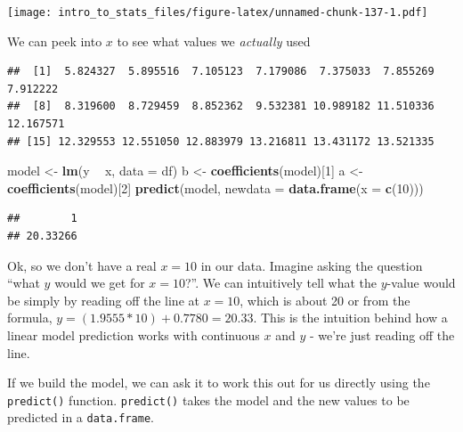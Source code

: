 \documentclass[
]{book}
\newenvironment{Shaded}{\begin{snugshade}}{\end{snugshade}}
\newcommand{\DataTypeTok}[1]{\textcolor[rgb]{0.13,0.29,0.53}{#1}}
\newcommand{\DecValTok}[1]{\textcolor[rgb]{0.00,0.00,0.81}{#1}}
\newcommand{\KeywordTok}[1]{\textcolor[rgb]{0.13,0.29,0.53}{\textbf{#1}}}
\newcommand{\NormalTok}[1]{#1}
\newcommand{\OperatorTok}[1]{\textcolor[rgb]{0.81,0.36,0.00}{\textbf{#1}}}
\newcommand{\StringTok}[1]{\textcolor[rgb]{0.31,0.60,0.02}{#1}}
\begin{document}
\texttt{[image: intro\_to\_stats\_files/figure-latex/unnamed-chunk-137-1.pdf]}

We can peek into \(x\) to see what values we \emph{actually} used

\begin{Shaded}
\end{Shaded}

\begin{verbatim}
##  [1]  5.824327  5.895516  7.105123  7.179086  7.375033  7.855269  7.912222
##  [8]  8.319600  8.729459  8.852362  9.532381 10.989182 11.510336 12.167571
## [15] 12.329553 12.551050 12.883979 13.216811 13.431172 13.521335
\end{verbatim}

\begin{Shaded}
\begin{Highlighting}[]
\NormalTok{model <-}\StringTok{ }\KeywordTok{lm}\NormalTok{(y }\OperatorTok{~}\StringTok{ }\NormalTok{x, }\DataTypeTok{data =}\NormalTok{ df)}
\NormalTok{b <-}\StringTok{ }\KeywordTok{coefficients}\NormalTok{(model)[}\DecValTok{1}\NormalTok{]}
\NormalTok{a <-}\StringTok{ }\KeywordTok{coefficients}\NormalTok{(model)[}\DecValTok{2}\NormalTok{]}
\KeywordTok{predict}\NormalTok{(model, }\DataTypeTok{newdata =} \KeywordTok{data.frame}\NormalTok{(}\DataTypeTok{x =} \KeywordTok{c}\NormalTok{(}\DecValTok{10}\NormalTok{)))}
\end{Highlighting}
\end{Shaded}

\begin{verbatim}
##        1 
## 20.33266
\end{verbatim}

Ok, so we don't have a real \(x = 10\) in our data. Imagine asking the question ``what \(y\) would we get for \(x = 10\)?''. We can intuitively tell what the \(y\)-value would be simply by reading off the line at \(x = 10\), which is about 20 or from the formula, \(y = (1.9555 * 10) + 0.7780 = 20.33\). This is the intuition behind how a linear model prediction works with continuous \(x\) and \(y\) - we're just reading off the line.

If we build the model, we can ask it to work this out for us directly using the \texttt{predict()} function. \texttt{predict()} takes the model and the new values to be predicted in a \texttt{data.frame}.
\end{document}
